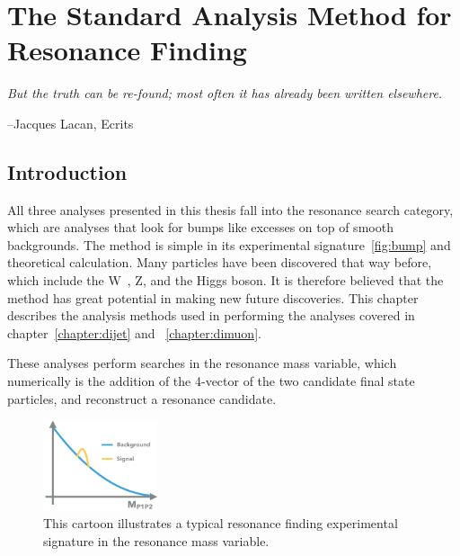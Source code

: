 \chapter{The Standard Analysis Method for Resonance Finding}
\label{StandardAnalysisMethod}

\epigraph{\textit{But the truth can be re-found; most often it has already been written elsewhere.}}{--Jacques Lacan, Ecrits}



\section{Introduction}
All three analyses presented in this thesis fall into the resonance search category, which are analyses that look for bumps like excesses on top of smooth backgrounds. The method is simple in its experimental signature~\ref{fig:bump} and theoretical calculation. Many particles have been discovered that way before, which include the W~\cite{Arnison:142059}, Z, and the Higgs boson. It is therefore believed that the method has great potential in making new future discoveries. This chapter describes the analysis methods used in performing the analyses covered in chapter~\ref{chapter:dijet} and ~\ref{chapter:dimuon}. 


These analyses perform searches in the resonance mass variable, which numerically is the addition of the 4-vector of the two candidate final state particles, and reconstruct a resonance candidate. 

\begin{figure}[!htb]
    \begin{center}
        \includegraphics[width=0.3\textwidth]{figures/chapter_analysismethod/resonance}
        \caption{
            This cartoon illustrates a typical resonance finding experimental signature in the resonance mass variable. 
        }
        \label{fig:triggerturnon}
    \end{center}
\end{figure}
\FloatBarrier

